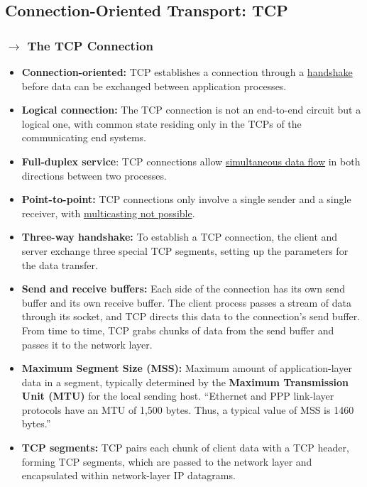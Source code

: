 \clearpage
\subsection[3.5 Connection-Oriented Transport: TCP]{\hspace*{0.075 em}\raisebox{0.2 em}{$\pmb{\drsh}$} Connection-Oriented Transport: TCP}
\label{subsec:TCP}

\subsubsection[3.5.1 The TCP Connection]{$\pmb{\rightarrow}$ The TCP Connection}

\begin{itemize}
    \item \textbf{Connection-oriented:} TCP establishes a connection through a \underline{handshake} before data can be exchanged between application processes.
    
    \item \textbf{Logical connection:} The TCP connection is not an end-to-end circuit but a logical one, with common state residing only in the TCPs of the communicating end systems.
    
    \item \textbf{Full-duplex service}: TCP connections allow \underline{simultaneous data flow} in both directions between two processes.
    
    \item \textbf{Point-to-point:} TCP connections only involve a single sender and a single receiver, with \underline{multicasting not possible}.
    
    \item \textbf{Three-way handshake:} To establish a TCP connection, the client and server exchange three special TCP segments, setting up the parameters for the data transfer.
    
    \item \textbf{Send and receive buffers:} Each side of the connection has its own send buffer and its own receive buffer. The client process passes a stream of data through its socket, and TCP directs this data to the connection's send buffer. From time to time, TCP grabs chunks of data from the send buffer and passes it to the network layer.
    
    \item \textbf{Maximum Segment Size (MSS):} Maximum amount of application-layer data in a segment, typically determined by the \textbf{Maximum Transmission Unit (MTU)} for the local sending host. ``Ethernet and PPP link-layer protocols have an MTU of 1,500 bytes. Thus, a typical value of MSS is 1460 bytes.''\cite{Kurose2017}
    
    \item \textbf{TCP segments:} TCP pairs each chunk of client data with a TCP header, forming TCP segments, which are passed to the network layer and encapsulated within network-layer IP datagrams.
\end{itemize}

